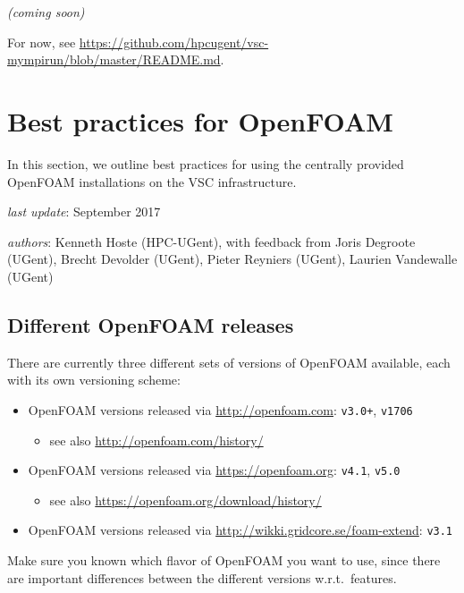 \textit{(coming soon)}

For now, see {\small\url{https://github.com/hpcugent/vsc-mympirun/blob/master/README.md}}.


\section{Best practices for OpenFOAM}
\label{sec:best-practices-openfoam}

In this section, we outline best practices for using the centrally provided OpenFOAM installations
on the VSC \hpc infrastructure.

\textit{last update}: September 2017

\textit{authors}: Kenneth Hoste (HPC-UGent), with feedback from Joris Degroote (UGent), Brecht Devolder (UGent),
                  Pieter Reyniers (UGent), Laurien Vandewalle (UGent)


\subsection{Different OpenFOAM releases}
\label{sec:best-practices-openfoam-releases}

There are currently three different sets of versions of OpenFOAM available, each with its own versioning scheme:

\begin{itemize}
    \item OpenFOAM versions released via \url{http://openfoam.com}: {\small\texttt{v3.0+}}, {\small\texttt{v1706}}
    \begin{itemize}
        \item see also \url{http://openfoam.com/history/}
    \end{itemize}
    \item OpenFOAM versions released via \url{https://openfoam.org}: {\small\texttt{v4.1}}, {\small\texttt{v5.0}}
    \begin{itemize}
        \item see also \url{https://openfoam.org/download/history/}
    \end{itemize}
    \item OpenFOAM versions released via \url{http://wikki.gridcore.se/foam-extend}: {\small\texttt{v3.1}}
\end{itemize}

Make sure you known which flavor of OpenFOAM you want to use, since there are important differences between
the different versions w.r.t.\ features.

